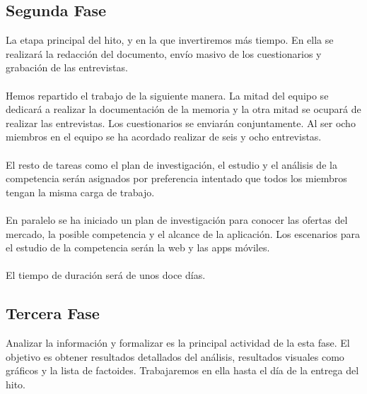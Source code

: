 \documentclass[12pt]{article}
\begin{document}
\subsection{Segunda Fase}
La etapa principal del hito, y en la que invertiremos más tiempo. En ella se realizará la redacción del documento, envío masivo de los cuestionarios y grabación de las entrevistas.
\\
\\
Hemos repartido el trabajo de la siguiente manera. La mitad del equipo se dedicará a realizar la documentación de la memoria y la otra mitad se ocupará de realizar las entrevistas. Los cuestionarios se enviarán conjuntamente. Al ser ocho miembros en el equipo se ha acordado realizar de seis y ocho entrevistas.
\\
\\
El resto de tareas como el plan de investigación, el estudio y el análisis de la competencia serán asignados por preferencia intentado que todos los miembros tengan la misma carga de trabajo.
\\
\\
En paralelo se ha iniciado un plan de investigación para conocer las ofertas del mercado, la posible competencia y el alcance de la aplicación. Los escenarios para el estudio de la competencia serán la web y las apps móviles.
\\
\\
El tiempo de duración será de unos doce días.
\subsection{Tercera Fase}
Analizar la información y formalizar es la principal actividad de la esta fase. El objetivo es obtener resultados detallados del análisis, resultados visuales como gráficos y la lista de factoides. Trabajaremos en ella hasta el día de la entrega del hito.
\end{document}
